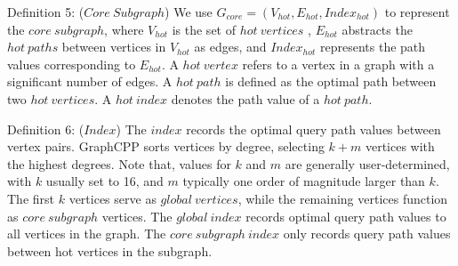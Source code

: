 \documentclass[lettersize,journal]{IEEEtran} %
\begin{document}
Definition 5: ($Core~Subgraph$) We use $G_{core}=(V_{hot},E_{hot},Index_{hot})$ to represent the $core~subgraph$, where $V_{hot}$ is the set of $hot~vertices$ , $E_{hot}$ abstracts the $hot~paths$ between vertices in $V_{hot}$ as edges, and $Index_{hot}$ represents the path values corresponding to $E_{hot}$. A $hot~vertex$ refers to a vertex in a graph with a significant number of edges. A $hot~path$ is defined as the optimal path between two $hot~vertices$. A $hot~index$ denotes the path value of a $hot~path$.

Definition 6: ($Index$) The $index$ records the optimal query path values between vertex pairs. GraphCPP sorts vertices by degree, selecting $k+m$ vertices with the highest degrees. Note that, values for $k$ and $m$ are generally user-determined, with $k$ usually set to 16, and $m$ typically one order of magnitude larger than $k$. The first $k$ vertices serve as $global~vertices$, while the remaining vertices function as $core~subgraph$ vertices. The $global~index$ records optimal query path values to all vertices in the graph. The $core~subgraph~index$ only records query path values between hot vertices in the subgraph.
\end{document}
